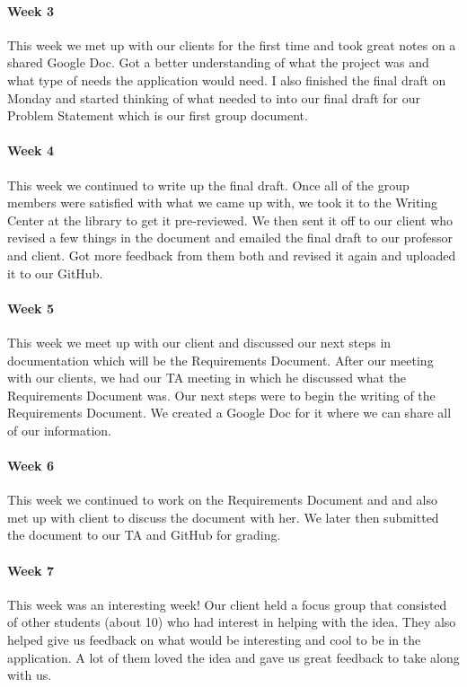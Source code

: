 \documentclass[onecolumn, draftclsnofoot,10pt, compsoc]{IEEEtran}
\begin{document}
      \paragraph{Week 3}
      This week we met up with our clients for the first time and took great notes on a shared Google Doc. Got a better understanding of what the project was and what type of needs the application would need. I also finished the final draft on Monday and started thinking of what needed to into our final draft for our Problem Statement which is our first group document.

      \paragraph{Week 4}
      This week we continued to write up the final draft. Once all of the group members were satisfied with what we came up with, we took it to the Writing Center at the library to get it pre-reviewed. We then sent it off to our client who revised a few things in the document and emailed the final draft to our professor and client. Got more feedback from them both and revised it again and uploaded it to our GitHub.

      \paragraph{Week 5}
      This week we meet up with our client and discussed our next steps in documentation which will be the Requirements Document. After our meeting with our clients, we had our TA meeting in which he discussed what the Requirements Document was. Our next steps were to begin the writing of the Requirements Document. We created a Google Doc for it where we can share all of our information.

      \paragraph{Week 6}
      This week we continued to work on the Requirements Document and and also met up with client to discuss the document with her. We later then submitted the document to our TA and GitHub for grading.

      \paragraph{Week 7}
      This week was an interesting week! Our client held a focus group that consisted of other students (about 10) who had interest in helping with the idea. They also helped give us feedback on what would be interesting and cool to be in the application. A lot of them loved the idea and gave us great feedback to take along with us.
\end{document}
